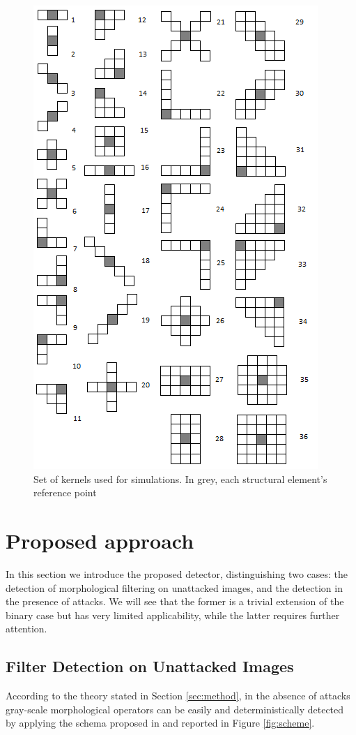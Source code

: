 \documentclass[review]{elsarticle}
\begin{document}
\begin{figure}[!ht]
	\centering
	\includegraphics[width=0.7\linewidth]{masks.png}
	\caption{Set of kernels used for simulations. In grey, each structural element's reference point}
	\label{fig:masks}
\end{figure}

\section{Proposed approach}
In this section we introduce the proposed detector, distinguishing two cases: the detection of morphological filtering on unattacked images, and the detection in the presence of attacks. We will see that the former is a trivial extension of the binary case but has very limited applicability, while the latter requires further attention.

\subsection{Filter Detection on Unattacked Images}

According to the theory stated in Section \ref{sec:method}, in the absence of attacks gray-scale morphological operators can be easily and deterministically detected by applying the schema proposed in \cite{de2017detecting} and reported in Figure \ref{fig:scheme}.
\end{document}
